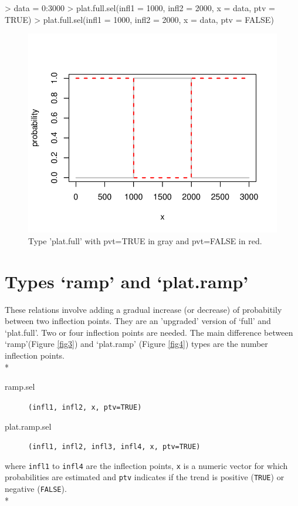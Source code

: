 \documentclass[letterpaper, 12pt]{article}
\begin{document}
\newpage
\begin{Schunk}
\begin{Sinput}
> data = 0:3000
> plat.full.sel(infl1 = 1000, infl2 = 2000, x = data, ptv = TRUE)
> plat.full.sel(infl1 = 1000, infl2 = 2000, x = data, ptv = FALSE)
\end{Sinput}
\end{Schunk}
\begin{figure}[h]
\begin{center}
\includegraphics{relation_sel-004}
\end{center}
\caption{Type 'plat.full' with pvt=TRUE in gray and pvt=FALSE in red.}
\label{fig2}
\end{figure}


\newpage

\section{Types `ramp' and `plat.ramp'}
\noindent These relations involve adding a gradual increase (or decrease) of probabitily between two inflection points. 
They are an 'upgraded' version of `full' and `plat.full'. Two or four inflection points are needed. 
 The main difference between `ramp'(Figure \ref{fig3}) and `plat.ramp' (Figure \ref{fig4}) types are the number 
 inflection points.\\*

\begin{description}
\item[ramp.sel]\verb#(infl1, infl2, x, ptv=TRUE)#
\item[plat.ramp.sel]\verb#(infl1, infl2, infl3, infl4, x, ptv=TRUE)#
\end{description}
where \verb#infl1# to \verb#infl4# are the inflection points, \verb#x# is a numeric vector for which probabilities are 
estimated and \verb#ptv# indicates if the trend is positive  (\verb#TRUE#) or negative (\verb#FALSE#).\\*
\end{document}
